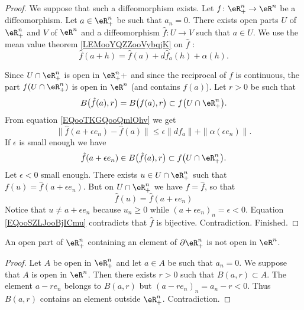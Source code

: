 \begin{proof}
	We suppose that such a diffeomorphism exists. Let \(f \colon \eR^n_+\to \eR^n  \) be a diffeomorphism. Let \( a\in \eR^n_+\) be such that \( a_n=0\). There exists open parts \( U\) of \( \eR^n_+\) and \( V\) of \( \eR^n\) and a diffeomorphism \(\hat f \colon U\to V  \) such that \( a\in U\). We use the mean value theorem \ref{LEMooYQZZooVybqjK} on \( \hat f\) :
	\begin{equation}	\label{EQooTKGQooQmlOhv}
		\hat f(a+h)=\hat f(a)+d\hat f_a(h)+\alpha(h).
	\end{equation}

	Since \( U\cap \eR^n_+\) is open in \( \eR^n_++\) and since the reciprocal of \( f\) is continuous, the part \( f(U\cap \eR^n_+)\) is open in \( \eR^n\) (and contains \( f(a)\)). Let \( r>0\) be such that
	\begin{equation}
		B\big( \hat f(a), r \big)=   B\big( f(a),r \big)\subset f\big( U\cap \eR^n_+ \big).
	\end{equation}
	From equation \eqref{EQooTKGQooQmlOhv} we get
	\begin{equation}
		\| \hat f(a+\epsilon e_n)-\hat f(a) \|\leq \epsilon\| df_a \|+\| \alpha(\epsilon e_n) \|.
	\end{equation}
	If \( \epsilon\) is small enough we have
	\begin{equation}
		\hat f(a+\epsilon e_n)\in B\big( \hat f(a),r \big)\subset f\big( U\cap \eR^n_+ \big).
	\end{equation}
	Let \( \epsilon<0\) small enough. There exists \( u\in U\cap \eR^n_+\) such that \( f(u)=\hat f(a+\epsilon e_n)\). But on \( U\cap \eR^n_+\) we have \( f=\hat f\), so that
	\begin{equation}		\label{EQooSZLJooBjICmu}
		\hat f(u)=\hat f(a+\epsilon e_n)
	\end{equation}
	Notice that \( u\neq a+\epsilon e_n\) because \( u_n\geq 0\) while \( (a+\epsilon e_n)_n=\epsilon<0\). Equation \eqref{EQooSZLJooBjICmu} contradicts that \( \hat f\) is bijective. Contradiction. Finished.
\end{proof}

\begin{lemma}	\label{LEMooEVSVooKJrgKz}
	An open part of \( \eR^n_+\) containing an element of \( \partial\eR^n_+\) is not open in \( \eR^n\).
\end{lemma}

\begin{proof}
	Let \( A\) be open in \( \eR^n_+\) and let \( a\in A\) be such that \( a_n=0\). We suppose that \( A\) is open in \( \eR^n\). Then there exists \( r>0\) such that \( B(a,r)\subset A\). The element \( a-re_n\) belongs to \( B(a,r)\) but \( (a-re_n)_n=a_n-r<0\). Thus \( B(a,r)\) contains an element outside \( \eR^n_+\). Contradiction.
\end{proof}


